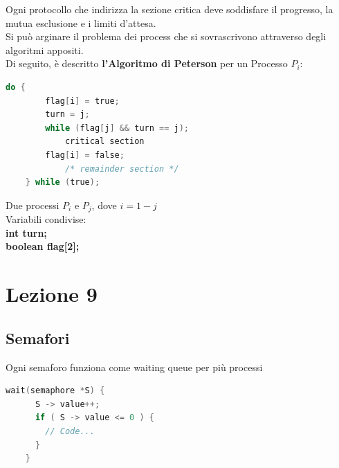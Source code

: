 \documentclass[12pt, a4paper]{article}
\begin{document}
	Ogni protocollo che indirizza la sezione critica deve soddisfare il progresso, la mutua esclusione e i limiti d'attesa. \\
	Si può arginare il problema dei process che si sovrascrivono attraverso degli algoritmi appositi. \\
	Di seguito, è descritto \textbf{l'Algoritmo di Peterson} per un Processo $P_i$:
		
	\begin{lstlisting}[language=C]
	do {
		flag[i] = true;
		turn = j;
		while (flag[j] && turn == j);
			critical section
		flag[i] = false;
			/* remainder section */
	} while (true);
	\end{lstlisting}

	Due processi $P_i$ e $P_j$, dove $i = 1 - j$ \\
	Variabili condivise: \\
	\textbf{int turn;}  \\
	\textbf{boolean flag[2];}
	
	
	
	\section*{Lezione 9}
	
	\subsection*{Semafori}
	Ogni semaforo funziona come waiting queue per più processi
	\begin{lstlisting}[language=C]
	wait(semaphore *S) {
	  S -> value++;
	  if ( S -> value <= 0 ) {
	  	// Code...
  	  }
  	}
	\end{lstlisting}
	
\end{document}
